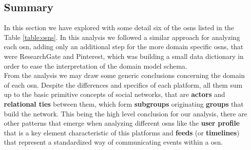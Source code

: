 \subsection{Summary}
In this section we have explored with some detail six of the \glspl{osn} listed in the Table \ref{table:osns}. In this analysis we followed a similar approach for analyzing each \gls{osn}, adding only an additional step for the more domain specific \glspl{osn}, that were ResearchGate and Pinterest, which was building a small data dictionary in order to ease the interpretation of the domain model schema.\\
\indent From the analysis we may draw some generic conclusions concerning the domain of each \gls{osn}. Despite the differences and specifics of each platform, all them sum up to the basic primitive concepts of social networks, that are \textbf{actors} and \textbf{relational ties} between them, which form \textbf{subgroups} originating \textbf{groups} that build the network. This being the high level conclusion for our analysis, there are other patterns that emerge when analyzing different \glspl{osn} like the \textbf{user profile} that is a key element characteristic of this platforms and \textbf{feeds} (or \textbf{timelines}) that represent a standardized way of communicating events within a \gls{osn}.
